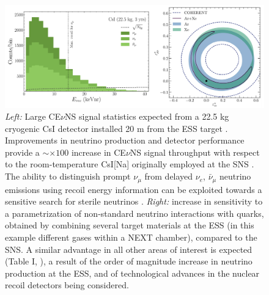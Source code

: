 \begin{figure}[htb!]
\begin{center}
\includegraphics[width=5.3in]{fig2.pdf}
\caption{\label{fig:fig2}\scriptsize {\it Left:} Large CE$\nu$NS signal statistics expected from a 22.5 kg cryogenic CsI detector installed 20 m from the ESS target \cite{ESS}. Improvements in neutrino production and detector performance provide a $\sim\times100$ increase in CE$\nu$NS signal throughput with respect to the room-temperature CsI[Na] originally employed at the SNS \cite{ESS}. The ability to distinguish prompt $\nu_{\mu}$ from delayed $\nu_{e}$, $\bar{\nu}_{\mu}$ neutrino emissions using recoil energy information can be exploited towards a sensitive search for sterile neutrinos \cite{carlos}.  {\it Right:} increase in sensitivity to a parametrization of non-standard neutrino interactions with quarks, obtained by combining several target materials at the ESS (in this example different gases within a NEXT chamber), compared to the SNS. A similar advantage in all other areas of interest is expected (Table I, \cite{ESS}), a result of the order of magnitude increase in neutrino production at the ESS, and of technological advances in the nuclear recoil detectors being considered.}
\end{center}
\end{figure}

